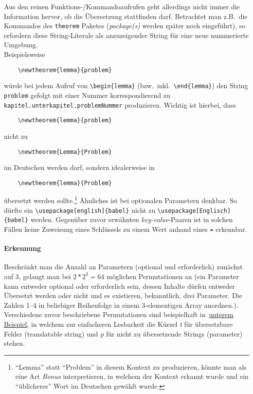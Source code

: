 Aus den reinen Funktions-/Kommandoaufrufen geht allerdings nicht immer die Information hervor, ob die Übersetzung stattfinden darf. Betrachtet man z.B.\ die Kommandos des \texttt{theorem} Paketes (\textit{package(s)} werden später noch eingeführt), so erfordern diese String-Literale als anzuzeigender String für eine neue nummerierte Umgebung.\\
Beispielsweise
\begin{Verbatim}
    \newtheorem{lemma}{problem}
\end{Verbatim}
würde bei jedem Aufruf von \verb"\begin{lemma}" (bzw.\ inkl.\ \verb|\end{lemma}|) den String \verb"problem" gefolgt mit einer Nummer korrespondierend zu \texttt{kapitel.unterkapitel.problemNummer} produzieren. Wichtig ist hierbei, dass 
\begin{Verbatim}
    \newtheorem{lemma}{problem}
\end{Verbatim}
nicht zu 
\begin{Verbatim}
    \newtheorem{Lemma}{Problem}
\end{Verbatim}
im Deutschen werden darf, sondern idealerweise in 
\begin{Verbatim}
    \newtheorem{lemma}{Problem}
\end{Verbatim}
übersetzt werden sollte.\footnote{\enquote{Lemma} statt \enquote{Problem} in diesem Kontext zu produzieren, könnte man als eine Art \textit{Bonus} interpretieren, in welchem der Kontext erkannt wurde und ein \enquote{üblicheres} Wort im Deutschen gewählt wurde.}
Ähnliches ist bei optionalen Parametern denkbar. So dürfte ein \verb"\usepackage[english]{babel}" nicht zu \verb"\usepackage[Englisch]{babel}" werden. Gegenüber zuvor erwähnten \textit{key-value}-Paaren ist in solchen Fällen keine Zuweisung eines Schlüssels zu einem Wert anhand eines \verb-=- erkennbar.


\paragraph{Erkennung}
Beschränkt man die Anzahl an Parametern (optional und erforderlich) zunächst auf 3, gelangt man bei ${2*2}^{3}=64$ möglichen Permutationen an (ein Parameter kann entweder optional oder erforderlich sein, dessen Inhalte dürfen entweder Übersetzt werden oder nicht und es existieren, bekanntlich, drei Parameter. Die Zahlen 1--4 in beliebiger Reihenfolge in einem 3-elementigen Array anordnen.). 
Verschiedene zuvor beschriebene Permutationen sind beispielhaft in~\hyperref[tab:problems:exampleParameter]{unterem Beispiel}, in welchem zur einfacheren Lesbarkeit die Kürzel \textit{t} für übersetzbare Felder (translatable string) und \textit{p} für nicht zu übersetzende Strings (parameter) stehen.

